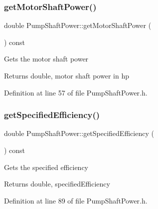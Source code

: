 \mbox{\label{class_pump_shaft_power_acb91eadb960f946ffee5373d4839a5be}} 
\subsubsection{\texorpdfstring{get\+Motor\+Shaft\+Power()}{getMotorShaftPower()}}
{\footnotesize\ttfamily double Pump\+Shaft\+Power\+::get\+Motor\+Shaft\+Power (\begin{DoxyParamCaption}{ }\end{DoxyParamCaption}) const\hspace{0.3cm}{\ttfamily [inline]}}

Gets the motor shaft power \begin{DoxyReturn}{Returns}
double, motor shaft power in hp 
\end{DoxyReturn}


Definition at line 57 of file Pump\+Shaft\+Power.\+h.

\mbox{\label{class_pump_shaft_power_a93c70d2b6f70d6d98b97859fc095193a}} 
\subsubsection{\texorpdfstring{get\+Specified\+Efficiency()}{getSpecifiedEfficiency()}}
{\footnotesize\ttfamily double Pump\+Shaft\+Power\+::get\+Specified\+Efficiency (\begin{DoxyParamCaption}{ }\end{DoxyParamCaption}) const\hspace{0.3cm}{\ttfamily [inline]}}

Gets the specified efficiency \begin{DoxyReturn}{Returns}
double, specified\+Efficiency 
\end{DoxyReturn}


Definition at line 89 of file Pump\+Shaft\+Power.\+h.

\mbox{\label{class_pump_shaft_power_a5cbcf0acd63ae4a2ffe9a5c13ba73a3a}} 
